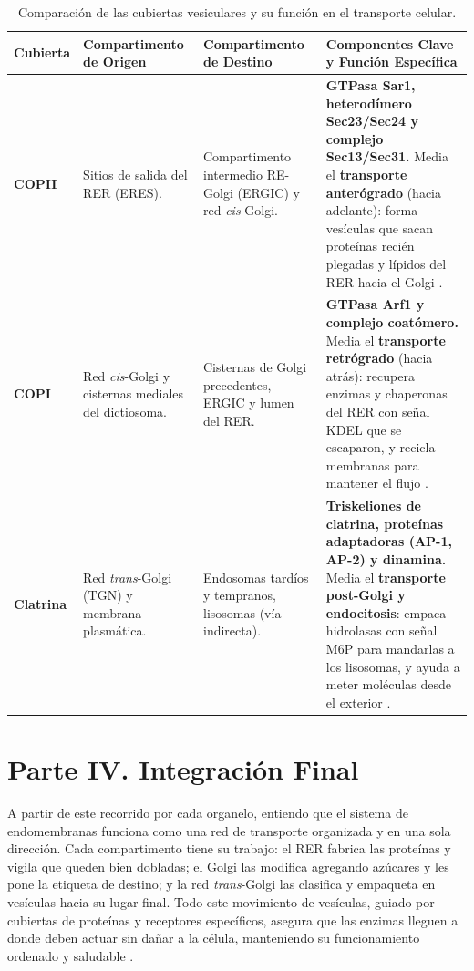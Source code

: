 \documentclass[spanish,letterpaper,oneside]{article}
\begin{document}
\begin{table}[htbp]
\centering
\scriptsize
\setlength{\tabcolsep}{4.5pt}
\renewcommand{\arraystretch}{1.08}
\begin{tabularx}{\textwidth}{p{1.6cm}p{2.8cm}p{2.8cm}Z}
\toprule
\textbf{Cubierta} & \textbf{Compartimento de Origen} & \textbf{Compartimento de Destino} & \textbf{Componentes Clave y Función Específica} \\
\midrule
\textbf{COPII} & Sitios de salida del RER (ERES). & Compartimento intermedio RE-Golgi (ERGIC) y red \textit{cis}-Golgi. & 
\textbf{GTPasa Sar1, heterodímero Sec23/Sec24 y complejo Sec13/Sec31.} Media el \textbf{transporte anterógrado} (hacia adelante): forma vesículas que sacan proteínas recién plegadas y lípidos del RER hacia el Golgi \parencite{alberts2022molecular, fortoul2020histologia}. \\
\addlinespace[0.15cm]
\textbf{COPI} & Red \textit{cis}-Golgi y cisternas mediales del dictiosoma. & Cisternas de Golgi precedentes, ERGIC y lumen del RER. & 
\textbf{GTPasa Arf1 y complejo coatómero.} Media el \textbf{transporte retrógrado} (hacia atrás): recupera enzimas y chaperonas del RER con señal KDEL que se escaparon, y recicla membranas para mantener el flujo \parencite{lodish2021molecular, fortoul2020histologia}. \\
\addlinespace[0.15cm]
\textbf{Clatrina} & Red \textit{trans}-Golgi (TGN) y membrana plasmática. & Endosomas tardíos y tempranos, lisosomas (vía indirecta). & 
\textbf{Triskeliones de clatrina, proteínas adaptadoras (AP-1, AP-2) y dinamina.} Media el \textbf{transporte post-Golgi y endocitosis}: empaca hidrolasas con señal M6P para mandarlas a los lisosomas, y ayuda a meter moléculas desde el exterior \parencite{mathews2013bioquimica, kierszenbaum2020histologia}. \\
\bottomrule
\end{tabularx}
\caption{Comparación de las cubiertas vesiculares y su función en el transporte celular.}
\label{tab:cubiertas_vesiculares}
\end{table}

\clearpage

\section{Parte IV. Integración Final}
A partir de este recorrido por cada organelo, entiendo que el sistema de endomembranas funciona como una red de transporte organizada y en una sola dirección. Cada compartimento tiene su trabajo: el RER fabrica las proteínas y vigila que queden bien dobladas; el Golgi las modifica agregando azúcares y les pone la etiqueta de destino; y la red \textit{trans}-Golgi las clasifica y empaqueta en vesículas hacia su lugar final. Todo este movimiento de vesículas, guiado por cubiertas de proteínas y receptores específicos, asegura que las enzimas lleguen a donde deben actuar sin dañar a la célula, manteniendo su funcionamiento ordenado y saludable \parencite{alberts2022molecular, lodish2021molecular, fortoul2020histologia}.
\end{document}
